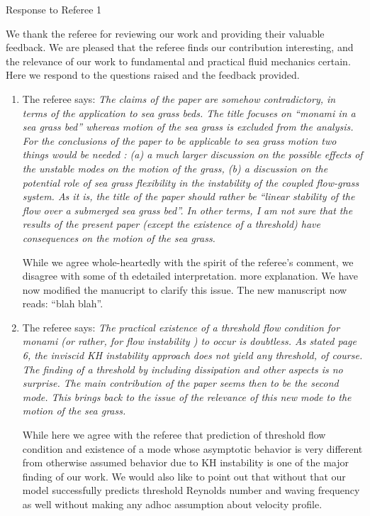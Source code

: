 \documentclass[letterpaper,10pt]{article}
\begin{document}
\centerline{Response to Referee 1}
We thank the referee for reviewing our work and providing their valuable feedback. 
We are pleased that the referee finds our contribution interesting, and the relevance of our work to fundamental and practical fluid mechanics certain.
Here we respond to the questions raised and the feedback provided.

\begin{enumerate}
\item The referee says:
\textit{
The claims of the paper are somehow contradictory, in terms of the application to sea grass beds. The title focuses on “monami in a sea grass bed” whereas motion of the sea grass is excluded from the analysis.  For the conclusions of the paper to be applicable to sea grass motion two things would be needed : (a) a much larger discussion on the possible effects of the unstable modes on the motion of the grass, (b) a discussion on the potential role of sea grass flexibility in the instability of the coupled flow-grass system. As it is, the  title of the paper should rather  be “linear stability of the flow over a submerged sea grass bed”. In other terms, I am not sure that the results of the present paper (except the existence of a threshold) have consequences on the motion of the sea grass.
}

While we agree whole-heartedly with the spirit of the referee's comment, we disagree with some of th edetailed interpretation. more explanation. We have now modified the manucript to clarify this issue. The new manuscript now reads: ``blah blah''.

\item The referee says:
\textit{
The practical existence of a threshold flow condition for monami (or rather,  for flow instability ) to occur is doubtless.  As stated page 6, the inviscid KH instability approach does not yield any threshold, of course. The finding of a threshold by including dissipation and other aspects is no surprise. The main contribution of the paper seems then to be the second mode. This brings back to the issue of the relevance of this new mode to the motion of the sea grass.
}

While here we agree with the referee that prediction of threshold flow condition and existence of a mode whose asymptotic behavior is very different from otherwise assumed behavior due to KH instability is one of the major finding of our work. We would also like to point out that without that our model successfully predicts threshold Reynolds number and  waving frequency  as well without making any adhoc assumption about velocity profile. 


\end{enumerate}
\end{document}
